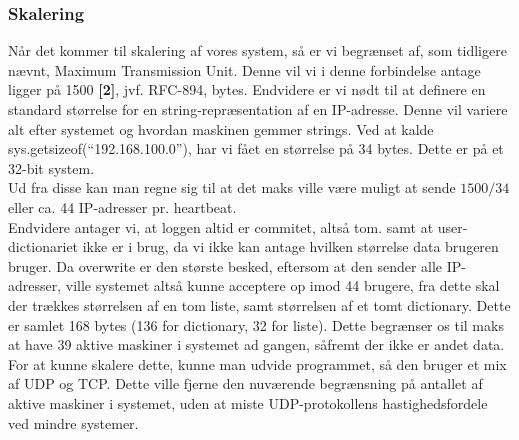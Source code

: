 \documentclass[a4paper,12pt]{article}
\begin{document}
\subsubsection{Skalering}
Når det kommer til skalering af vores system, så er vi begrænset af, som tidligere nævnt, Maximum Transmission Unit. Denne vil vi i denne forbindelse antage ligger på 1500 \textbf{[2]}, jvf. RFC-894, bytes. Endvidere er vi nødt til at definere en standard størrelse for en string-repræsentation af en IP-adresse. Denne vil variere alt efter systemet og hvordan maskinen gemmer strings. Ved at kalde sys.getsizeof(“192.168.100.0”), har vi fået en størrelse på 34 bytes. Dette er på et 32-bit system.
\\[5px]
Ud fra disse kan man regne sig til at det maks ville være muligt at sende $1500 / 34$ eller ca. 44 IP-adresser pr. heartbeat. 
\\ 
Endvidere antager vi, at loggen altid er commitet, altså tom. samt at user-dictionariet ikke er i brug, da vi ikke kan antage hvilken størrelse data brugeren bruger.
Da overwrite er den største besked, eftersom at den sender alle IP-adresser, ville systemet altså kunne acceptere op imod 44 brugere, fra dette skal der trækkes størrelsen af en tom liste, samt størrelsen af et tomt dictionary. Dette er samlet 168 bytes (136 for dictionary, 32 for liste). 
Dette begrænser os til maks at have 39 aktive maskiner i systemet ad gangen, såfremt der ikke er andet data.
\\
For at kunne skalere dette, kunne man udvide programmet, så den bruger et mix af UDP og TCP. Dette ville fjerne den nuværende begrænsning på antallet af aktive maskiner i systemet, uden at miste UDP-protokollens hastighedsfordele ved mindre systemer.
\newpage
\end{document}
